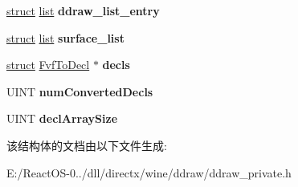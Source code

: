 \begin{DoxyCompactItemize}
\hyperlink{interfacestruct}{struct} \hyperlink{classlist}{list} {\bfseries ddraw\+\_\+list\+\_\+entry}
\item 
\mbox{\label{structddraw_a57c2b0ba862d22ed4d5e1c13065c2e40}} 
\hyperlink{interfacestruct}{struct} \hyperlink{classlist}{list} {\bfseries surface\+\_\+list}
\item 
\mbox{\label{structddraw_aa166bf768a9bdcbff5c9d3cee5cb7dbb}} 
\hyperlink{interfacestruct}{struct} \hyperlink{struct_fvf_to_decl}{Fvf\+To\+Decl} $\ast$ {\bfseries decls}
\item 
\mbox{\label{structddraw_ae2fc6df65b5852fb5bfb7a1a955c6e4d}} 
U\+I\+NT {\bfseries num\+Converted\+Decls}
\item 
\mbox{\label{structddraw_afd9d6b6d144b43a94a6fe141415081ec}} 
U\+I\+NT {\bfseries decl\+Array\+Size}
\end{DoxyCompactItemize}


该结构体的文档由以下文件生成\+:\begin{DoxyCompactItemize}
\item 
E\+:/\+React\+O\+S-\/0../dll/directx/wine/ddraw/ddraw\+\_\+private.\+h\end{DoxyCompactItemize}
